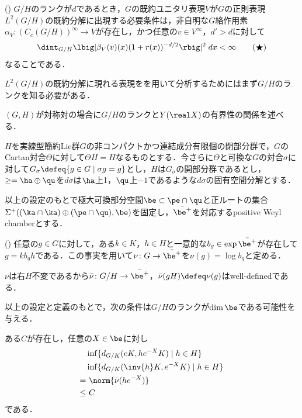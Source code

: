 \begin{thm*}(\cite[pp.~665--6]{ber88})\label{thm:plancherel}
  $G/H$のランクが$d$であるとき，$G$の既約ユニタリ表現$V$が$G$の正則表現$L^2(G/H)$の既約分解に出現する必要条件は，非自明な$G$絡作用素$\alpha_V\colon (C_c(G/H))^{\infty}\to V $が存在し，かつ任意の$v\in V^{\infty} $，$d' > d$に対して
  \begin{align}
    \dint_{G/H}\lbig|\beta_V(v)(x)(1+r(x))^{-d/2} \rbig|^2\; dx < \infty\label{eq:ber88}\tag{$\bigstar$}
  \end{align}
  なることである．%
\end{thm*}

$L^2(G/H)$の既約分解に現れる表現をを用いて分析するためにはまず$G/H$のランクを知る必要がある．

$(G,H)$が対称対の場合に$G/H$のランクと$Y(\real X) $の有界性の関係を述べる．
\begin{setting*}
  $H$を実線型簡約Lie群$G$の非コンパクトかつ連結成分有限個の閉部分群で，$G$のCartan対合$\Theta$に対して$\Theta H = H$なるものとする．今さらに$\Theta $と可換な$G$の対合$\sigma$に対して$G_{\sigma}\defeq \{g\in G \mid \sigma g = g \} $とし，$H$は$G_{\sigma} $の開部分群であるとし，$\ge = \ha\oplus \qu $を$d\sigma $は$\ha$上1，$\qu$上${-1}$であるような$d\sigma$の固有空間分解とする．

  以上の設定のもとで極大可換部分空間$\be\subset \pe\cap \qu $と正ルートの集合$\Sigma^{+}((\ka\cap\ka)\oplus(\pe\cap \qu), \be ) $を固定し，$\bar{\be^{+}} $を対応するpositive Weyl chamberとする．
\end{setting*}
\begin{thmdef*}(\cite[p.~151]{kk16})
  任意の$g\in G$に対して，ある$k\in K$，$h\in H$と一意的な$b_g\in \exp\bar{\be^{+}} $が存在して$g = kb_gh$である．この事実を用いて$\nu\colon G\to \bar{\be^{+}} $を$\nu(g) = \log b_{g} $と定める．
\end{thmdef*}

$\nu$は右$H$不変であるから$\bar{\nu}\colon G/H\to \bar{\be^{+}} $，$\bar{\nu}(gH) \defeq \nu(g) $はwell-definedである．

以上の設定と定義のもとで，次の条件は$G/H$のランクが$\dim \be $である可能性を与える．
\begin{cond*}
  ある$C$が存在し，任意の$X \in \be $に対し
  \begin{align*}
    &\inf\{d_{G/K}(eK,  he^{-X}K)\mid h\in H \}  \\
    &\inf\{d_{G/K}(\inv{h}K,  e^{-X}K)\mid h\in H \}  \\
    =&\ \norm{\bar{\nu}(he^{-X})} \\
    \leq&\ C
  \end{align*}
  である．
\end{cond*}

